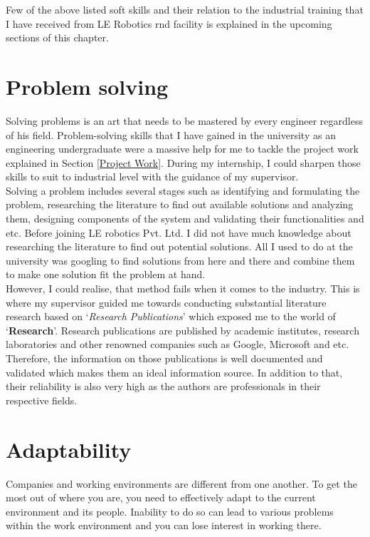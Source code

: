 \documentclass[a4paper,12pt]{report}
\begin{document}
Few of the above listed soft skills and their relation to the industrial training that I have received from  LE Robotics \ac{rnd} facility is explained in the upcoming sections of this chapter.

\section{Problem solving} 

Solving problems is an art that needs to be mastered by every engineer regardless of his field. Problem-solving skills that I have gained in the university as an engineering undergraduate were a massive help for me to tackle the project work explained in Section \ref{Project Work}. During my internship, I could sharpen those skills to suit to industrial level with the guidance of my supervisor.\\

Solving a problem includes several stages such as identifying and formulating the problem, researching the literature to find out available solutions and analyzing them, designing components of the system and validating their functionalities and etc. Before joining LE robotics Pvt. Ltd. I did not have much knowledge about researching the literature to find out potential solutions. All I used to do at the university was googling to find solutions from here and there and combine them to make one solution fit the problem at hand.\\

However, I could realise, that method fails when it comes to the industry. This is where my supervisor guided me towards conducting substantial literature research based on `\textit{Research Publications}' which exposed me to the world of `\textbf{Research}'. Research publications are published by academic institutes, research laboratories and other renowned companies such as Google, Microsoft and etc. Therefore, the information on those publications is well documented and validated which makes them an ideal information source. In addition to that, their reliability is also very high as the authors are professionals in their respective fields.



\section{Adaptability} 

Companies and working environments are different from one another. To get the most out of where you are, you need to effectively adapt to the current environment and its people. Inability to do so can lead to various problems within the work environment and you can lose interest in working there.\\
\end{document}
